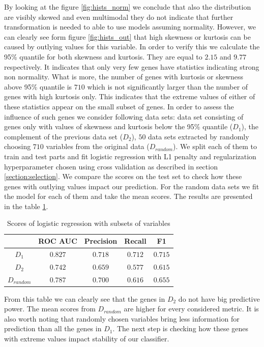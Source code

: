 \documentclass[shortabstract, english, mgr]{iithesis}
\begin{document}
By looking at the figure \ref{fig:hists_norm} we conclude that also the distribution are visibly skewed and even multimodal they do not indicate that further transformation is needed to able to use models assuming normality. However, we can clearly see form figure \ref{fig:hists_out} that high skewness or kurtosis can be caused by outlying values for this variable. In order to verify this we calculate the 95\% quantile for both skewness and kurtosis. They are equal to $2.15$ and $9.77$ respectively. It indicates that only very few genes have statistics indicating strong non normality. What is more, the number of genes with kurtosis or skewness above 95\% quantile is $710$ which is not significantly larger than the number of genes with high kurtosis only. This indicates that the extreme values of either of these statistics appear on the small subset of genes. In order to assess the influence of such genes we consider following data sets: data set consisting of genes only with values of skewness and kurtosis below the 95\% quantile ($D_1$), the complement of the previous data set ($D_2$), $50$ data sets extracted by randomly choosing $710$ variables from the original data ($D_{random}$). We split each of them to train and test parts and fit logistic regression with L1 penalty and regularization hyperparameter chosen using cross validation as described in section \ref{section:selection}. We compare the scores on the test set to check how these genes with outlying values impact our prediction. For the random data sets we fit the model for each of them and take the mean scores. The results are presented in the table \ref{tab:scores-trunc}.
\begin{table}
\centering
    \begin{tabular}[t]{c c c c c}
    \toprule
    & ROC AUC & Precision & Recall & F1\\
    \midrule
    $D_1$ & $0.827$ & $0.718$ &	$0.712$ & $0.715$ \\
    $D_2$ & $0.742$ & $0.659$ & $0.577$ & $0.615$ \\
    $D_{random}$ & $0.787$ & $0.700$ & $0.616$ & $0.655$ \\
    \bottomrule
\end{tabular}
    \caption{Scores of logistic regression with subsets of variables}
    \label{tab:scores-trunc}
\end{table}

From this table we can clearly see that the genes in $D_2$ do not have big predictive power. The mean scores from $D_{random}$ are higher for every considered metric. It is also worth noting that randomly chosen variables bring less information for prediction than all the genes in $D_1$. The next step is checking how these genes with extreme values impact stability of our classifier.
\end{document}
